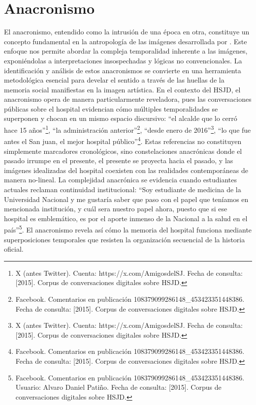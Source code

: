 \section{Anacronismo}

El anacronismo, entendido como la intrusión de una época en otra, constituye un concepto fundamental en la antropología de las imágenes desarrollada por \parencite{DidiHuberman2011}. Este enfoque nos permite abordar la compleja temporalidad inherente a las imágenes, exponiéndolas a interpretaciones insospechadas y lógicas no convencionales. La identificación y análisis de estos anacronismos se convierte en una herramienta metodológica esencial para develar el sentido a través de las huellas de la memoria social manifiestas en la imagen artística. En el contexto del HSJD, el anacronismo opera de manera particularmente reveladora, pues las conversaciones públicas sobre el hospital evidencian cómo múltiples temporalidades se superponen y chocan en un mismo espacio discursivo: ``el alcalde que lo cerró hace 15 años''\footnote{X (antes Twitter). Cuenta: https://x.com/AmigosdelSJ. Fecha de consulta: [2015]. Corpus de conversaciones digitales sobre HSJD.}, ``la administración anterior''\footnote{Facebook. Comentarios en publicación 108379099286148\_453423351448386. Fecha de consulta: [2015]. Corpus de conversaciones digitales sobre HSJD.}, ``desde enero de 2016''\footnote{X (antes Twitter). Cuenta: https://x.com/AmigosdelSJ. Fecha de consulta: [2015]. Corpus de conversaciones digitales sobre HSJD.}, ``lo que fue antes el San juan, el mejor hospital público''\footnote{Facebook. Comentarios en publicación 108379099286148\_453423351448386. Fecha de consulta: [2015]. Corpus de conversaciones digitales sobre HSJD.}. Estas referencias no constituyen simplemente marcadores cronológicos, sino constelaciones anacrónicas donde el pasado irrumpe en el presente, el presente se proyecta hacia el pasado, y las imágenes idealizadas del hospital coexisten con las realidades contemporáneas de manera no-lineal. La complejidad anacrónica se evidencia cuando estudiantes actuales reclaman continuidad institucional: ``Soy estudiante de medicina de la Universidad Nacional y me gustaría saber que paso con el papel que teníamos en mencionada institución, y cuál sera nuestro papel ahora, puesto que si ese hospital es emblemático, es por el aporte inmenso de la Nacional a la salud en el país''\footnote{Facebook. Comentarios en publicación 108379099286148\_453423351448386. Usuario: Alvaro Daniel Patiño. Fecha de consulta: [2015]. Corpus de conversaciones digitales sobre HSJD.}. El anacronismo revela así cómo la memoria del hospital funciona mediante superposiciones temporales que resisten la organización secuencial de la historia oficial.

